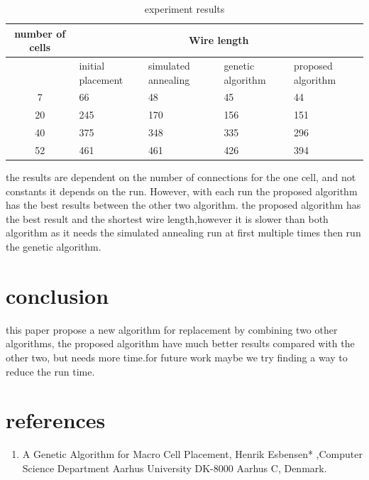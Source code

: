 \documentclass[conference]{IEEEtran}
\begin{document}
\begin{table}[h!]
\centering
\begin{tabular}{ |c || p{1.5cm}|p{1.5cm}|p{1.5cm}|p{1.5cm}|}
 \hline
 number of cells & \multicolumn{4}{|c|}{Wire length} \\
 \hline
   & initial placement & simulated annealing & genetic algorithm & proposed algorithm\\
 \hline
 7 & 66 & 48 & 45 & 44 \\ [1ex] 
 \hline
 20 & 245 & 170 & 156& 151 \\[1ex] 
 \hline
 40 & 375 & 348 & 335 & 296\\[1ex] 
 \hline
 52 & 461 & 461 & 426& 394 \\ [1ex] 
 \hline
\end{tabular}
\caption{experiment results}
\label{table:1}
\end{table}
the results are dependent on the number of connections for the one cell, and not constants it depends on the run. However, with each run the proposed algorithm has the best results between the other two algorithm. \newline
the proposed algorithm has the best result and the shortest wire length,however it is slower than both algorithm as it needs the simulated annealing run at first multiple times then run the genetic algorithm.

\section{conclusion}
this paper propose a new algorithm for replacement by combining two other algorithms, the proposed algorithm have much better results compared with the other two, but needs more time.\newline for future work maybe we try finding a way to reduce the run time.
\section{references}
\begin{enumerate} 
\item A Genetic Algorithm for Macro Cell Placement, Henrik Esbensen*
,Computer Science Department Aarhus University DK-8000 Aarhus C, Denmark.

\end{enumerate}
\end{document}
